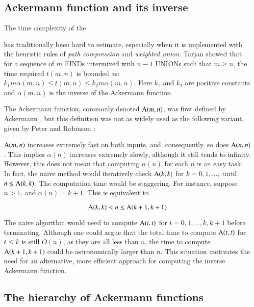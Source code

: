 \subsection{Ackermann function and its inverse}

 The time complexity of the

has traditionally
been hard to estimate, especially when it is implemented with the
heuristic rules of \emph{path compression} and \emph{weighted union}.
Tarjan \cite{tarjan} showed that for a sequence of $m$ FINDs
intermixed with $n-1$ UNIONs
such that $m \geq n$, the time required $t(m,n)$ is bounded
as: $k_{1}m\alpha(m,n) \leq t(m,n) \leq k_{2}m\alpha(m,n)$.
Here $k_{1}$ and $k_{2}$ are positive constants and $\alpha(m,n)$ is
the inverse of the Ackermann function.

The Ackermann function, commonly denoted $\text{A}(m, n)$,
was first defined by Ackermann \cite{ackermann}, but this
definition was not as widely used as the following variant,
given by Peter and Robinson \cite{peter-ackermann}:




$\text{A}(m, n)$ increases extremely fast on both inputs,
and, consequently, so does $\text{A}(n, n)$.
This implies $\alpha(n)$ increases extremely slowly,
although it still tends to infinity. However, this does
not mean that computing $\alpha(n)$ for each $n$ is an easy
task. In fact, the naive method would iteratively check
$\text{A}(k, k)$ for $k = 0, 1, \ldots, $ until $n \le \text{A}(k, k)$.
The computation time would be staggering.
For instance, suppose $n > 1$, and $\alpha(n) = k+1$.
This is equivalent to

\begin{equation}
\text{A}(k, k) < n \le \text{A}(k+1, k+1)
\end{equation}

The naive algorithm would need to compute
$\text{A}(t, t)$ for $t = 0, 1, \ldots, k, k+1$ before terminating.
{\color{magenta} Although one could argue that the total time to
compute $\text{A}(t, t)$ for $t\le k$ is still $O(n)$, as they are all
less than $n$, the time to compute $\text{A}(k+1, k+1)$ could be
astronomically larger than $n$.} This situation motivates the
need for an alternative, more efficient approach for computing
the inverse Ackermann function.

\subsection{The hierarchy of Ackermann functions}

